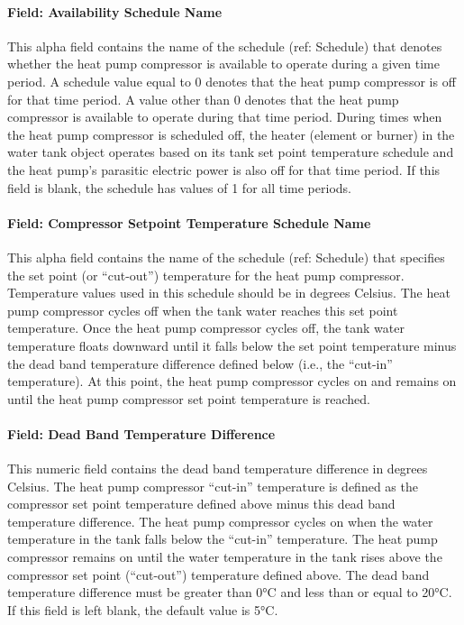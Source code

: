 \paragraph{Field: Availability Schedule Name}\label{field-availability-schedule-name-019}

This alpha field contains the name of the schedule (ref: Schedule) that denotes whether the heat pump compressor is available to operate during a given time period. A schedule value equal to 0 denotes that the heat pump compressor is off for that time period. A value other than 0 denotes that the heat pump compressor is available to operate during that time period. During times when the heat pump compressor is scheduled off, the heater (element or burner) in the water tank object operates based on its tank set point temperature schedule and the heat pump's parasitic electric power is also off for that time period. If this field is blank, the schedule has values of 1 for all time periods.

\paragraph{Field: Compressor Setpoint Temperature Schedule Name}\label{field-compressor-setpoint-temperature-schedule-name}

This alpha field contains the name of the schedule (ref: Schedule) that specifies the set point (or ``cut-out'') temperature for the heat pump compressor. Temperature values used in this schedule should be in degrees Celsius. The heat pump compressor cycles off when the tank water reaches this set point temperature. Once the heat pump compressor cycles off, the tank water temperature floats downward until it falls below the set point temperature minus the dead band temperature difference defined below (i.e., the ``cut-in'' temperature). At this point, the heat pump compressor cycles on and remains on until the heat pump compressor set point temperature is reached.

\paragraph{Field: Dead Band Temperature Difference}\label{field-dead-band-temperature-difference-000}

This numeric field contains the dead band temperature difference in degrees Celsius. The heat pump compressor ``cut-in'' temperature is defined as the compressor set point temperature defined above minus this dead band temperature difference. The heat pump compressor cycles on when the water temperature in the tank falls below the ``cut-in'' temperature. The heat pump compressor remains on until the water temperature in the tank rises above the compressor set point (``cut-out'') temperature defined above. The dead band temperature difference must be greater than 0°C and less than or equal to 20°C. If this field is left blank, the default value is 5°C.

